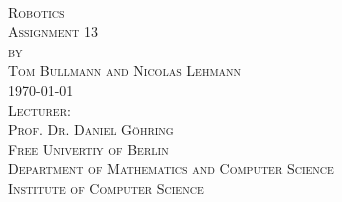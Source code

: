 \begin{titlepage}
  \begin{center}
    \Large
    \textsc
    {
    	\\
    	\vspace{2cm}
    	Robotics
    }\\
  	\vspace{5cm}
  	\textsc
  	{
  		Assignment 13\\[0.5\baselineskip]
  		by\\[0.5\baselineskip]
  		Tom Bullmann and Nicolas Lehmann
  	}\\
  	\vspace{5cm}
    \textsc{\today}\\
    \vspace{1cm}
    \textsc
    {
    	Lecturer:\\
    	Prof. Dr. Daniel G\"ohring
    }\\
  	\vspace{1cm}
  	\textsc{
  		Free Univertiy of Berlin\\
  		Department of Mathematics and Computer Science\\
  		Institute of Computer Science
  	}\\
  \end{center}
\end{titlepage}